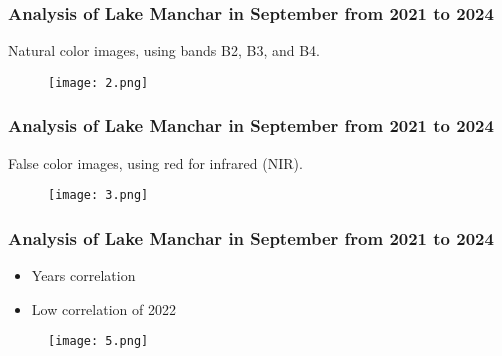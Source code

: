 \documentclass{beamer}
\begin{document}
\begin{frame}
  \frametitle{\small Analysis of Lake Manchar in September from 2021 to 2024} 
    \centering
    \small Natural color images, using bands B2, B3, and B4.
    
    \begin{figure}
        \centering
        \texttt{[image: 2.png]}
        \label{fig:enter-label}
    \end{figure}
  
\end{frame}

\begin{frame}
  \frametitle{\small Analysis of Lake Manchar in September from 2021 to 2024} 

    \centering
    \small False color images, using red for infrared (NIR).
    \begin{figure}
        \centering
        \texttt{[image: 3.png]}
        \label{fig:enter-label}
    \end{figure}
  
\end{frame}


  

\begin{frame}
  \frametitle{\small Analysis of Lake Manchar in September from 2021 to 2024} 

    \begin{itemize}
        \item \small Years correlation
        \item \small Low correlation of 2022
    \end{itemize}

    \begin{figure}
        \centering
        \texttt{[image: 5.png]}
        \label{fig:enter-label}
    \end{figure}
  
\end{frame}
\end{document}
